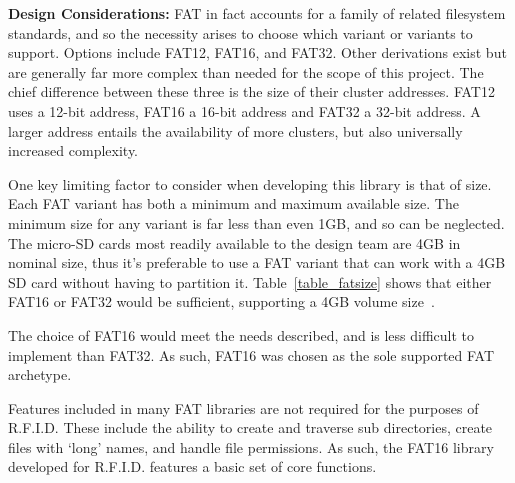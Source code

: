 


\textbf{Design Considerations:} FAT in fact accounts for a family of related filesystem standards, and so the necessity arises to choose which variant or variants to support. Options include FAT12, FAT16, and FAT32. Other derivations exist but are generally far more complex than needed for the scope of this project.
The chief difference between these three is the size of their cluster addresses. FAT12 uses a 12-bit address, FAT16 a 16-bit address and FAT32 a 32-bit address. A larger address entails the availability of more clusters, but also universally increased complexity.
\par

One key limiting factor to consider when developing this library is that of size. Each FAT variant has both a minimum and maximum available size. The minimum size for any variant is far less than even 1GB, and so can be neglected. The micro-SD cards most readily available to the design team are 4GB in nominal size, thus it's preferable to use a FAT variant that can work with a 4GB SD card without having to partition it. Table~\ref{table_fatsize} shows that either FAT16 or FAT32 would be sufficient, supporting a 4GB volume size~\cite{src_FAT-filesizes}.



The choice of FAT16 would meet the needs described, and is less difficult to implement than FAT32. As such, FAT16 was chosen as the sole supported FAT archetype. 

Features included in many FAT libraries are not required for the purposes of R.F.I.D. These include the ability to create and traverse sub directories, create files with `long' names, and handle file permissions. As such, the FAT16 library developed for R.F.I.D. features a basic set of core functions.

